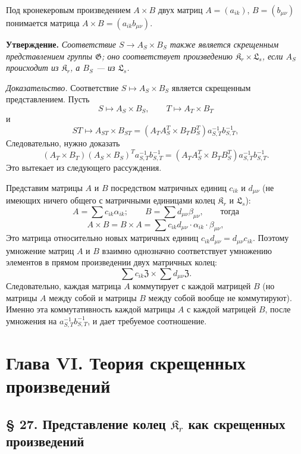 \documentclass[11pt]{article}
\begin{document}
Под кронекеровым произведением \(A\times B\) двух матриц \(A=(a_{ik})\), \(B=(b_{\mu\nu})\) понимается матрица \(A\times B=(a_{ik}b_{\mu\nu})\).

\noindent\textbf{Утверждение.} \emph{Соответствие \(S\to A_S\times B_S\) также является скрещенным представлением группы \(\mathfrak G\); оно соответствует произведению \(\mathfrak K_r\times\mathfrak L_s\), если \(A_S\) происходит из \(\mathfrak K_r\), а \(B_S\) --- из \(\mathfrak L_s\).}

\noindent\emph{Доказательство.} Соответствие \(S\mapsto A_S\times B_S\) является скрещенным представлением. Пусть
\[
S\mapsto A_S\times B_S,\qquad T\mapsto A_T\times B_T
\]
и
\[
ST\mapsto A_{ST}\times B_{ST}
=(A_TA_S^T\times B_TB_S^T)a_{S,T}^{-1}b_{S,T}^{-1},
\]
Следовательно, нужно доказать
\[
(A_T\times B_T)(A_S\times B_S)^T a_{S,T}^{-1}b_{S,T}^{-1}
=(A_TA_S^T\times B_TB_S^T)a_{S,T}^{-1}b_{S,T}^{-1}.
\]
Это вытекает из следующего рассуждения.

Представим матрицы \(A\) и \(B\) посредством матричных единиц \(c_{ik}\) и \(d_{\mu\nu}\) (не имеющих ничего общего с матричными единицами колец \(\mathfrak K_r\) и \(\mathfrak L_s\)):
\[
A=\sum c_{ik}\alpha_{ik};\qquad
B=\sum d_{\mu\nu}\beta_{\mu\nu},\qquad\text{тогда}
\]
\[
A\times B=B\times A
=\sum c_{ik}d_{\mu\nu}\cdot\alpha_{ik}\cdot\beta_{\mu\nu},
\]
Это матрица относительно новых матричных единиц \(c_{ik}d_{\mu\nu}=d_{\mu\nu}c_{ik}\). Поэтому умножение матриц \(A\) и \(B\) взаимно однозначно соответствует умножению элементов в прямом произведении двух матричных колец:
\[
\sum c_{ik}\mathfrak Z\times\sum d_{\mu\nu}\mathfrak Z.
\]
Следовательно, каждая матрица \(A\) коммутирует с каждой матрицей \(B\) (но матрицы \(A\) между собой и матрицы \(B\) между собой вообще не коммутируют). Именно эта коммутативность каждой матрицы \(A\) с каждой матрицей \(B\), после умножения на \(a_{S,T}^{-1}b_{S,T}^{-1}\), и дает требуемое соотношение.

\section*{Глава VI. Теория скрещенных произведений}\label{kapitel-vi.-theorie-der-verschraenkten-produkte}

\subsection*{§ 27. Представление колец \(\mathfrak K_r\) как скрещенных произведений}
\end{document}
